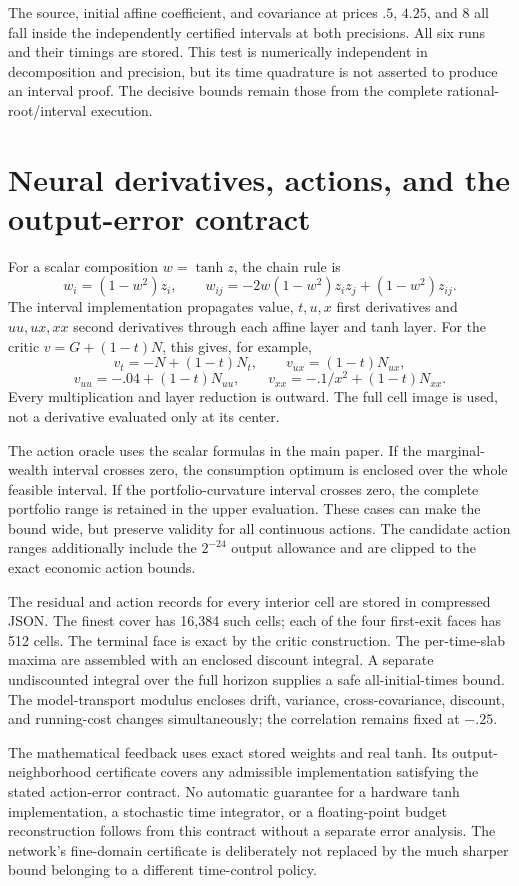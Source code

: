 The source, initial affine coefficient, and covariance at prices $.5$, $4.25$, and $8$ all fall inside the independently certified intervals at both precisions. All six runs and their timings are stored. This test is numerically independent in decomposition and precision, but its time quadrature is not asserted to produce an interval proof. The decisive bounds remain those from the complete rational-root/interval execution.

\section{Neural derivatives, actions, and the output-error contract}
For a scalar composition $w=\tanh z$, the chain rule is
\[
 w_i=(1-w^2)z_i,\qquad
 w_{ij}=-2w(1-w^2)z_i z_j+(1-w^2)z_{ij}.
\]
The interval implementation propagates value, $t,u,x$ first derivatives and $uu,ux,xx$ second derivatives through each affine layer and tanh layer. For the critic $v=G+(1-t)N$, this gives, for example,
\[
 v_t=-N+(1-t)N_t,\qquad v_{ux}=(1-t)N_{ux},
\]
\[
 v_{uu}=-.04+(1-t)N_{uu},\qquad
 v_{xx}=-.1/x^2+(1-t)N_{xx}.
\]
Every multiplication and layer reduction is outward. The full cell image is used, not a derivative evaluated only at its center.

The action oracle uses the scalar formulas in the main paper. If the marginal-wealth interval crosses zero, the consumption optimum is enclosed over the whole feasible interval. If the portfolio-curvature interval crosses zero, the complete portfolio range is retained in the upper evaluation. These cases can make the bound wide, but preserve validity for all continuous actions. The candidate action ranges additionally include the $2^{-24}$ output allowance and are clipped to the exact economic action bounds.

The residual and action records for every interior cell are stored in compressed JSON. The finest cover has 16,384 such cells; each of the four first-exit faces has 512 cells. The terminal face is exact by the critic construction. The per-time-slab maxima are assembled with an enclosed discount integral. A separate undiscounted integral over the full horizon supplies a safe all-initial-times bound. The model-transport modulus encloses drift, variance, cross-covariance, discount, and running-cost changes simultaneously; the correlation remains fixed at $-.25$.

The mathematical feedback uses exact stored weights and real tanh. Its output-neighborhood certificate covers any admissible implementation satisfying the stated action-error contract. No automatic guarantee for a hardware tanh implementation, a stochastic time integrator, or a floating-point budget reconstruction follows from this contract without a separate error analysis. The network's fine-domain certificate is deliberately not replaced by the much sharper bound belonging to a different time-control policy.

